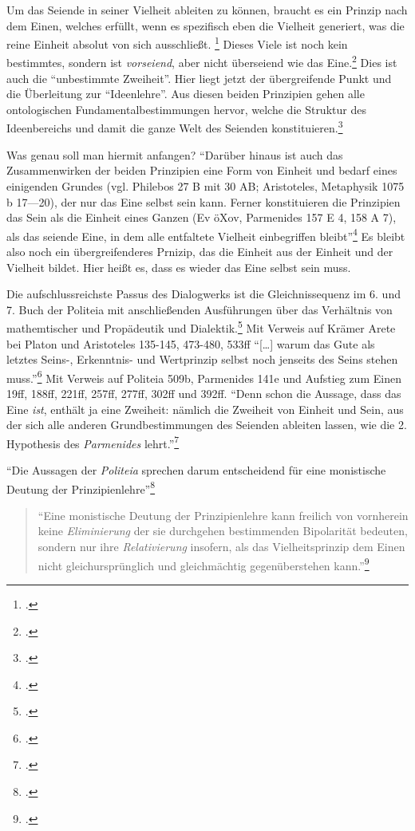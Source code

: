 \documentclass[12pt]{article}
\newcommand*{\zitatblock}[1]{%
    \begin{quote}
    \fontsize{10}{12}\selectfont
    \setlength{\parskip}{1.0em}
    #1
    \end{quote}
}
\begin{document}
Um das Seiende in seiner Vielheit ableiten zu können, braucht es ein Prinzip nach dem Einen, welches erfüllt, wenn es spezifisch eben die Vielheit generiert, was die reine Einheit absolut von sich ausschließt. \footcite[vgl.][S. 103]{halfwassen2015spuren} Dieses Viele ist noch kein bestimmtes, sondern ist \emph{vorseiend}, aber nicht überseiend wie das Eine.\footcite[vgl.][S. 103]{halfwassen2015spuren} Dies ist auch die \enquote{unbestimmte Zweiheit}.
Hier liegt jetzt der übergreifende Punkt und die Überleitung zur \enquote{Ideenlehre}. Aus diesen beiden Prinzipien gehen alle ontologischen Fundamentalbestimmungen hervor, welche die Struktur des Ideenbereichs und damit die ganze Welt des Seienden konstituieren.\footcite[vgl.][S. 104]{halfwassen2015spuren}

Was genau soll man hiermit anfangen? \enquote{Darüber hinaus ist auch das Zusammenwirken der beiden Prinzipien eine Form von Einheit und bedarf eines einigenden Grundes (vgl. Philebos 27 B mit 30 AB; Aristoteles, Metaphysik 1075 b 17—20), der nur das Eine selbst sein kann. Ferner konstituieren die Prinzipien das Sein als die Einheit eines Ganzen (Ev öXov, Parmenides 157 E 4, 158 A 7), als das seiende Eine, in dem alle entfaltete Vielheit einbegriffen bleibt}\footcite[][S. 106]{halfwassen2015spuren}
Es bleibt also noch ein übergreifenderes Prnizip, das die Einheit aus der Einheit und der Vielheit bildet. Hier heißt es, dass es wieder das Eine selbst sein muss.

Die aufschlussreichste Passus des Dialogwerks ist die Gleichnissequenz im 6. und 7. Buch der Politeia mit anschließenden Ausführungen über das Verhältnis von mathemtischer und Propädeutik und Dialektik.\footcite[vgl.][S. 135]{halfwassen2015spuren} Mit Verweis auf Krämer Arete bei Platon und Aristoteles 135-145, 473-480, 533ff
\enquote{[\dots] warum das Gute als letztes Seins-, Erkenntnis- und Wertprinzip selbst noch jenseits des Seins stehen muss.}\footcite[vgl.][S. 136]{halfwassen2015spuren} Mit Verweis auf Politeia 509b, Parmenides 141e und Aufstieg zum Einen 19ff, 188ff, 221ff, 257ff, 277ff, 302ff und 392ff. 
\enquote{Denn schon die Aussage, dass das Eine \emph{ist}, enthält ja eine Zweiheit: nämlich die Zweiheit von Einheit und Sein, aus der sich alle anderen Grundbestimmungen des Seienden ableiten lassen, wie die 2. Hypothesis des \emph{Parmenides} lehrt.}\footcite[][S. 136f.]{halfwassen2015spuren}

\enquote{Die Aussagen der \emph{Politeia} sprechen darum entscheidend für eine monistische Deutung der Prinzipienlehre}\footcite[][S. 137]{halfwassen2015spuren}
\zitatblock{\enquote{Eine monistische Deutung der Prinzipienlehre kann freilich von vornherein keine \emph{Eliminierung} der sie durchgehen bestimmenden Bipolarität bedeuten, sondern nur ihre \emph{Relativierung} insofern, als das Vielheitsprinzip dem Einen nicht gleichursprünglich und gleichmächtig gegenüberstehen kann.}\footcite[][S. 138]{halfwassen2015spuren}}
\end{document}
